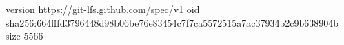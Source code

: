 version https://git-lfs.github.com/spec/v1
oid sha256:664fffd3796448d98b06be76e83454c7f7ca5572515a7ac37934b2c9b638904b
size 5566
